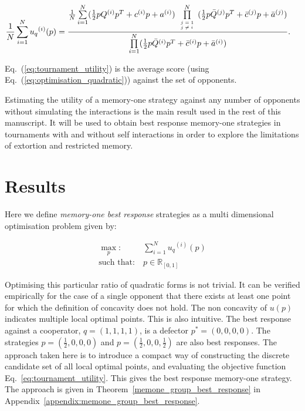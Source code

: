 \documentclass[10pt]{article}
\newcommand{\R}{\mathbb{R}}
\begin{document}
\begin{align}\label{eq:tournament_utility}
       & \frac{1}{N} \sum\limits_{i=1} ^ {N} {u_q}^{(i)} (p) =
       \frac{\frac{1}{N} \sum\limits_{i=1} ^ {N} (\frac{1}{2} pQ^{(i)} p^T + c^{(i)} p + a^ {(i)})
       \prod\limits_{\tiny\begin{array}{l} j=1 \\ j \neq i \end{array}} ^
       N (\frac{1}{2} p\bar{Q}^{(j)} p^T + \bar{c}^{(j)} p + \bar{a}^ {(j)})}
       {\prod\limits_{i=1} ^ N (\frac{1}{2} p\bar{Q}^{(i)} p^T + \bar{c}^{(i)} p + \bar{a}^ {(i)})}.
\end{align}

Eq.~(\ref{eq:tournament_utility}) is the average score (using Eq.~(\ref{eq:optimisation_quadratic})) against the set of opponents.

Estimating the utility of a memory-one strategy against any number of opponents
without simulating the interactions is the main result used in the rest of this manuscript.
It will be used to obtain best response memory-one strategies in tournaments
with and without self interactions in order to explore the limitations of extortion
and restricted memory.

\section{Results}\label{section:results}

Here we define \textit{memory-one best response}
strategies as a multi dimensional optimisation problem given by:

\begin{equation}\label{eq:mo_tournament_optimisation}
    \begin{aligned}
    \max_p: & \ \sum_{i=1} ^ {N} {u_q}^{(i)} (p)
    \\
    \text{such that}: & \ p \in \R_{[0, 1]}
    \end{aligned}
\end{equation}

Optimising this particular ratio of quadratic forms is not trivial. It can be
verified empirically for the case of a single opponent that there exists at
least one point for which the definition of concavity does not hold.
The non concavity of \(u(p)\) indicates multiple local
optimal points. This is also intuitive. The best response against a cooperator,
\(q=(1, 1, 1, 1)\), is a defector \(p^*=(0, 0, 0, 0)\). The strategies
\(p=(\frac{1}{2}, 0, 0, 0)\) and \(p=(\frac{1}{2}, 0, 0, \frac{1}{2})\) are also
best responses. The approach taken here is to introduce a compact way of
constructing the discrete candidate set of all local optimal points, and evaluating
the objective function Eq.~\ref{eq:tournament_utility}. This gives the best
response memory-one strategy. The approach is given in
Theorem~\ref{memone_group_best_response} in Appendix~\ref{appendix:memone_group_best_response}.
\end{document}
